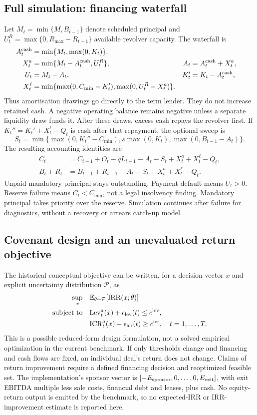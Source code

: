 \documentclass[11pt,a4paper]{article}
\newcommand{\E}{\mathbb{E}}
\newcommand{\ICR}{\mathrm{ICR}}
\newcommand{\Lev}{\mathrm{Lev}}
\theoremstyle{plain}
\theoremstyle{definition}
\begin{document}
\subsection{Full simulation: financing waterfall}
Let $M_t=\min\{M,B_{t-1}\}$ denote scheduled principal and
$U_t^R=\max\{0,R_{\max}-R_{t-1}\}$ available revolver capacity. The waterfall is
\begin{align}
A_t^{\rm cash}&=\min\{M_t,\max(0,K_t)\},\\
X_t^a&=\min\{M_t-A_t^{\rm cash},U_t^R\},& A_t&=A_t^{\rm cash}+X_t^a,\\
U_t&=M_t-A_t,& K_t'&=K_t-A_t^{\rm cash},\\
X_t^\ell&=\min\{\max(0,C_{\min}-K_t'),\max(0,U_t^R-X_t^a)\}.
\end{align}
Thus amortisation drawings go directly to the term lender. They do not increase
retained cash. A negative operating balance remains negative unless a separate
liquidity draw funds it. After these draws, excess cash repays the revolver first.
If $K_t''=K_t'+X_t^\ell-Q_t$ is cash after that repayment, the optional sweep is
\begin{equation}
S_t=\min\{\max(0,K_t''-C_{\min}),s\max(0,K_t),\max(0,B_{t-1}-A_t)\}.
\end{equation}
The resulting accounting identities are
\begin{align}
C_t&=C_{t-1}+O_t-qL_{t-1}-A_t-S_t+X_t^a+X_t^\ell-Q_t,\\
B_t+R_t&=B_{t-1}+R_{t-1}-A_t-S_t+X_t^a+X_t^\ell-Q_t.
\end{align}
Unpaid mandatory principal stays outstanding. Payment default means $U_t>0$.
Reserve failure means $C_t<C_{\min}$, not a legal insolvency finding. Mandatory
principal takes priority over the reserve. Simulation continues after failure for
diagnostics, without a recovery or arrears catch-up model.

\subsection{Covenant design and an unevaluated return objective}
The historical conceptual objective can be written, for a decision vector $x$ and
explicit uncertainty distribution $\mathcal P$, as
\begin{align}
\sup_x\quad &\E_{\theta\sim\mathcal P}[\mathrm{IRR}(x;\theta)]\label{eq:objective}\\
\text{subject to}\quad &\Lev_t^a(x)+\epsilon_{\rm lev}(t)\le c^{\rm lev},\nonumber\\
&\ICR_t^a(x)-\epsilon_{\rm icr}(t)\ge c^{\rm icr},\quad t=1,\ldots,T.\nonumber
\end{align}
This is a possible reduced-form design formulation, not a solved empirical
optimization in the current benchmark. If only thresholds change and financing
and cash flows are fixed, an individual deal's return does not change. Claims of
return improvement require a defined financing decision and reoptimized feasible
set. The implementation's sponsor vector is
$[-E_{\rm sponsor},0,\ldots,0,E_{\rm exit}]$, with exit EBITDA multiple less sale
costs, financial debt and leases, plus cash. No equity-return output is emitted
by the benchmark, so no expected-IRR or IRR-improvement estimate is reported here.
\end{document}

